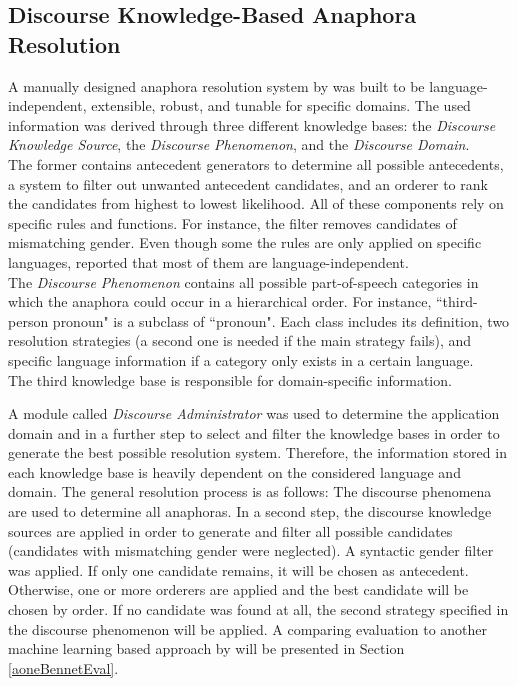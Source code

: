 \subsection{Discourse Knowledge-Based Anaphora Resolution}
\label{aonediscourseMD}
A manually designed anaphora resolution system by \citep{aone1993language} was built to be language-independent, extensible, robust, and tunable for specific domains. The used information was derived through three different knowledge bases: the \textit{Discourse Knowledge Source}, the \textit{Discourse Phenomenon}, and the \textit{Discourse Domain}. \\
The former contains antecedent generators to determine all possible antecedents, a system to filter out unwanted antecedent candidates, and an orderer to rank the candidates from highest to lowest likelihood. All of these components rely on specific rules and functions. For instance, the filter removes candidates of mismatching gender. Even though some the rules are only applied on specific languages, \cite{aone1993language} reported that most of them are language-independent.\\
The \textit{Discourse Phenomenon} contains all possible part-of-speech categories in which the anaphora could occur in a hierarchical order. For instance, ``third-person pronoun" is a subclass of ``pronoun". Each class includes its definition, two resolution strategies (a second one is needed if the main strategy fails), and specific language information if a category only exists in a certain language.\\
The third knowledge base is responsible for domain-specific information. 

A module called \textit{Discourse Administrator} was used to determine the application domain and in a further step to select and filter the knowledge bases in order to generate the best possible resolution system. Therefore, the information stored in each knowledge base is heavily dependent on the considered language and domain. The general resolution process is as follows: The discourse phenomena are used to determine all anaphoras. In a second step, the discourse knowledge sources are applied in order to generate and filter all possible candidates (candidates with mismatching gender were neglected). A syntactic gender filter was applied. If only one candidate remains, it will be chosen as antecedent. Otherwise, one or more orderers are applied and the best candidate will be chosen by order. If no candidate was found at all, the second strategy specified in the discourse phenomenon will be applied. A comparing evaluation to another machine learning based approach by \cite{aone1995evaluating} will be presented in Section \ref{aoneBennetEval}.

